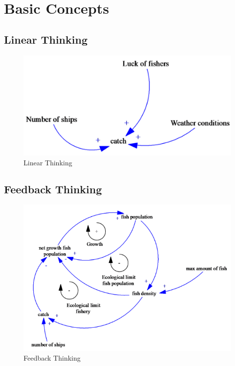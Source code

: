 \hypertarget{basic-concepts}{%
\section{Basic Concepts}\label{basic-concepts}}

\hypertarget{linear-thinking}{%
\subsection{Linear Thinking}\label{linear-thinking}}

\begin{figure}
\centering
\includegraphics{figures/linearThinking.png}
\caption{Linear Thinking}
\end{figure}

\hypertarget{feedback-thinking}{%
\subsection{Feedback Thinking}\label{feedback-thinking}}

\begin{figure}
\centering
\includegraphics{figures/feedbackThinking.png}
\caption{Feedback Thinking}
\end{figure}

